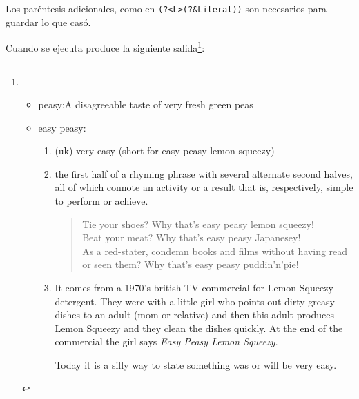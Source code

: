 Los paréntesis adicionales, como en \verb|(?<L>(?&Literal))| son necesarios 
para guardar lo que casó.

Cuando se ejecuta produce la siguiente salida\footnote{
\begin{itemize}
\item peasy:A disagreeable taste of very fresh green peas
\item easy peasy: 
\begin{enumerate}
  \item (uk) very easy (short for easy-peasy-lemon-squeezy) 
  \item         
  the first half of a rhyming phrase with several alternate second halves,
  all of which connote an activity or a result that is, respectively,
  simple to perform or achieve.

\begin{it}
\begin{verse}
  Tie your shoes? Why that's easy peasy lemon squeezy!\\
  Beat your meat? Why that's easy peasy Japanesey!\\
  As a red-stater, condemn books and films without having read or seen them? Why that's easy peasy puddin'n'pie!\\
\end{verse}
\end{it}
  \item
  It comes from a 1970's british TV commercial for Lemon Squeezy
  detergent. They were with a little girl who points out dirty greasy
  dishes to an adult (mom or relative) and then this adult produces
  Lemon Squeezy and they clean the dishes quickly. At the end of the
  commercial the girl says {\it Easy Peasy Lemon Squeezy}.

  Today it is a silly way to state something was or will be very easy. 
\end{enumerate}
\end{itemize}
}: %
